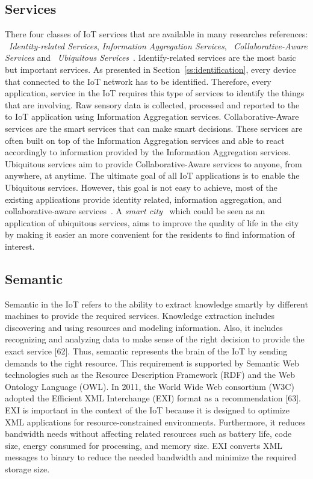 \subsection{Services}

There four classes of IoT services that are available in many researches references: ~\textit{Identity-related Services}, \textit{Information Aggregation Services}, ~\textit{Collaborative-Aware Services} and ~\textit{Ubiquitous Services}~\citep{Mohammed:2015}.
Identify-related services are the most basic but important services. 
As presented in Section~\ref{ss:identification}, every device that connected to the IoT network has to be identified.
Therefore, every application, service in the IoT requires this type of services to identify the things that are involving. 
Raw sensory data is collected, processed and reported to the to IoT application using Information Aggregation services. 
Collaborative-Aware services are the smart services that can make smart decisions.
These services are often built on top of the Information Aggregation services and able to react accordingly to information provided by the Information Aggregation services.
Ubiquitous services aim to provide Collaborative-Aware services to anyone, from anywhere, at anytime.
The ultimate goal of all IoT applications is to enable the Ubiquitous services.
However, this goal is not easy to achieve, most of the existing applications provide identity related, information aggregation, and collaborative-aware services~\citep{Al-Fuqaha:2015}.
A \textit{smart city}~\citep{Jin:2014, Zanella:2014} which could be seen as an application of ubiquitous services, aims to improve the quality of life in the city by making it easier an more convenient for the residents to find information of interest.

\subsection{Semantic}

Semantic in the IoT refers to the ability to extract knowledge smartly by different machines to provide the required services.
Knowledge extraction includes discovering and using resources and modeling information.
Also, it includes recognizing and analyzing data to make sense of the right decision to provide the exact service [62]. 
Thus, semantic represents the brain of the IoT by sending demands to the right resource. 
This requirement is supported by Semantic Web technologies such as the Resource Description Framework (RDF) and the Web Ontology
Language (OWL).
In 2011, the World Wide Web consortium (W3C) adopted the Efficient XML Interchange (EXI) format as a recommendation [63].
EXI is important in the context of the IoT because it is designed to optimize XML applications for resource-constrained environments. 
Furthermore, it reduces bandwidth needs without affecting related resources such as battery life, code size, energy consumed for processing, and memory size. 
EXI converts XML messages to binary to reduce the needed bandwidth and minimize the required storage size.



